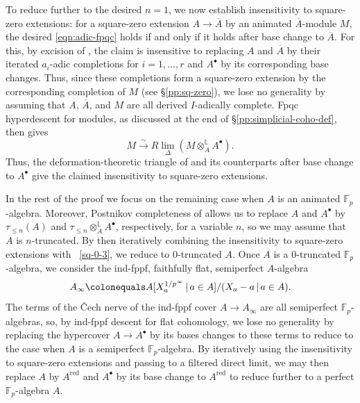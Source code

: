 \documentclass[11pt, reqno]{amsart}
\newcommand{\bF}{\mathbb{F}}
\newcommand{\bL}{\mathbb{L}}
\newcommand{\ce}{\colonequals}
\newcommand{\isomto}{\overset{\sim}{\longrightarrow}}
\newcommand{\ov}{\overline}
\newcommand{\ra}{\rightarrow}
\newcommand{\red}{{\mathrm{red}}}		%
\newcommand{\tensor}{\otimes} 			%
\newcommand{\tst}{\textstyle}
\numberwithin{equation}{numberingbase}
\theoremstyle{thms}
\theoremstyle{claims}
\theoremstyle{defs}
\theoremstyle{thms}
\theoremstyle{defs}
\theoremstyle{subsection-tweak}
\theoremstyle{subsection-tweak}
\begin{document}
To reduce further to the desired $n = 1$, we now establish insensitivity to square-zero extensions: for a square-zero extension $A \ra \ov{A}$ by an animated $\ov{A}$-module $M$, the desired \eqref{eqn:adic-fpqc} holds if and only if it holds after base change to $\ov{A}$. For this, by excision of , the claim is insensitive to replacing $A$ and $\ov{A}$ by their iterated $a_i$-adic completions for $i = 1, \dotsc, r$ and $A^\bullet$ by its corresponding base changes. Thus, since these completions form a square-zero extension by the corresponding completion of $M$ (see \S\ref{pp:sq-zero}), we lose no generality by assuming that $A$, $\ov{A}$, and $M$ are all derived $I$-adically complete. Fpqc hyperdescent for modules, as discussed at the end of \S\ref{pp:simplicial-coho-def}, then gives
\[
\tst M \isomto R\lim_\Delta(M \tensor^\bL_A A^\bullet).
\]
Thus, the deformation-theoretic triangle of  and its counterparts after base change to $A^\bullet$ give the claimed insensitivity to square-zero extensions.

In the rest of the proof we focus on the remaining case when $A$ is an animated $\bF_p$-algebra. Moreover, Postnikov completeness of  allows us to replace $A$ and $A^\bullet$ by $\tau_{\le n}(A)$ and $\tau_{\le n} \tensor^\bL_A A^\bullet$, respectively,  for a variable $n$, so %
we may assume that $A$ is $n$-truncated. By then iteratively combining the insensitivity to square-zero extensions with ~\ref{sq-0-3}, we reduce to $0$-truncated $A$. Once $A$ is a $0$-truncated $\bF_p$-algebra, we consider the ind-fppf, faithfully flat, semiperfect $A$-algebra
\[
A_\infty \ce A[X_a^{1/p^\infty}\, |\, a \in A]/(X_a - a\, |\, a \in A).
\]
The terms of the \v{C}ech nerve of the ind-fppf cover $A \ra A_\infty$ are all semiperfect $\bF_p$-algebras, so, by ind-fppf descent for flat cohomology, we lose no generality by replacing the hypercover $A \ra A^\bullet$ by its bases changes to these terms to reduce to the case when $A$ is a semiperfect $\bF_p$-algebra. By iteratively using the insensitivity to square-zero extensions and passing to a filtered direct limit, we may then replace $A$ by $A^\red$ and $A^\bullet$ by its base change to $A^\red$ to reduce further to a perfect $\bF_p$-algebra $A$. 
\end{document}
